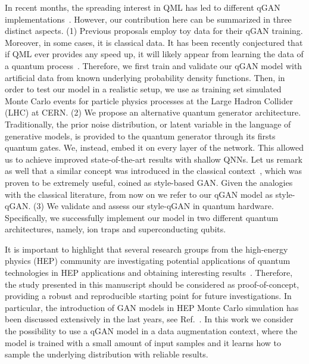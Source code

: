 \documentclass[twocolumn,preprintnumbers,superscriptaddress]{revtex4-2}
\begin{document}
In recent months, the spreading interest in QML has led to different qGAN
implementations~\cite{zoufal2019quantum, zeng2019learning, situ2020quantum,
  hu2019quantum, benedetti2019adversarial, romero2021variational,
  niu2021entangling}. However, our contribution here can be summarized in three
distinct aspects. (1) Previous proposals employ toy data for their qGAN
training. Moreover, in some cases, it is classical data. It has been recently
conjectured that if QML ever provides any speed up, it will likely appear from
learning the data of a quantum process~\cite{huang2021information,
  kubler2021inductive}. Therefore, we first train and validate our qGAN model with
artificial data from known underlying probability density functions. Then, in
order to test our model in a realistic setup, we use as training set simulated
Monte Carlo events for particle physics processes at the Large Hadron Collider
(LHC) at CERN. (2) We propose an alternative quantum generator architecture. Traditionally, the prior noise distribution, or latent variable in the language of generative models, is provided to the quantum generator through its firsts quantum gates. We, instead, embed it on every layer
of the network. This
allowed us to achieve improved state-of-the-art results with shallow QNNs. Let us remark as well that a similar concept was introduced in the classical context~\cite{karras2019style}, which was proven to be extremely useful, coined as style-based GAN. Given the analogies with the classical literature, from now on we refer to our qGAN model as style-qGAN. (3) We validate and
assess our style-qGAN in quantum hardware. Specifically, we successfully implement our
model in two different quantum architectures, namely, ion traps and
superconducting qubits.

It is important to highlight that several research groups from the high-energy
physics (HEP) community are investigating potential applications of quantum
technologies in HEP applications and obtaining interesting
results~\cite{P_rez_Salinas_2021,Guan_2021,chang2021quantum,Chang_2021,Belis_2021,khattak2021fast}.
Therefore, the study presented in this manuscript should be considered as
proof-of-concept, providing a robust and reproducible starting point for future
investigations. In particular, the introduction of GAN models in HEP Monte Carlo
simulation has been discussed extensively in the last years, see
Ref.~\cite{baldi2021gan,Backes_2021,butter2020generative,Butter_2021,Butter_2020,Bellagente_2020,Butter_2019}.
In this work we consider the possibility to use a qGAN model in a data
augmentation context, where the model is trained with a small amount of input
samples and it learns how to sample the underlying distribution with reliable
results.
\end{document}
